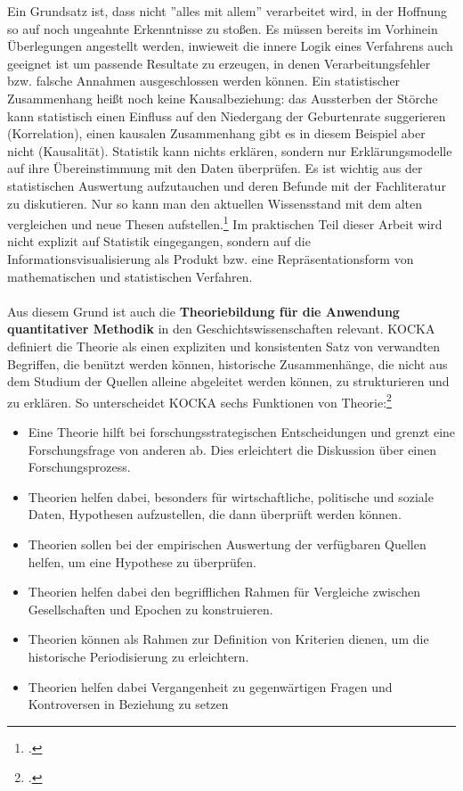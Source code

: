 \documentclass[12pt,a4paper]{article}
\begin{document}
Ein Grundsatz ist, dass nicht ''alles mit allem'' verarbeitet wird, in der Hoffnung so auf noch ungeahnte Erkenntnisse zu stoßen. Es müssen bereits im Vorhinein Überlegungen angestellt werden, inwieweit die innere Logik eines Verfahrens auch geeignet ist um passende Resultate zu erzeugen, in denen Verarbeitungsfehler bzw. falsche Annahmen ausgeschlossen werden können. Ein statistischer Zusammenhang heißt noch keine Kausalbeziehung: das Aussterben der Störche kann statistisch einen Einfluss auf den Niedergang der Geburtenrate suggerieren (Korrelation), einen kausalen Zusammenhang gibt es in diesem Beispiel aber nicht (Kausalität). Statistik kann nichts erklären, sondern nur Erklärungsmodelle auf ihre Übereinstimmung mit den Daten überprüfen. Es ist wichtig aus der statistischen Auswertung aufzutauchen und deren Befunde mit der Fachliteratur zu diskutieren. Nur so kann man den aktuellen Wissensstand mit dem alten vergleichen und neue Thesen aufstellen.\footcite[][S.182-191]{jarausch1985quantitative} Im praktischen Teil dieser Arbeit wird nicht explizit auf Statistik eingegangen, sondern auf die Informationsvisualisierung als Produkt bzw. eine Repräsentationsform von mathematischen und statistischen Verfahren.
\\
\\
Aus diesem Grund ist auch die \textbf{Theoriebildung für die Anwendung quantitativer Methodik} in den Geschichtswissenschaften relevant. KOCKA definiert die Theorie als einen expliziten und konsistenten Satz von verwandten Begriffen, die benützt werden können, historische Zusammenhänge, die nicht aus dem Studium der Quellen alleine abgeleitet werden können, zu strukturieren und zu erklären. So unterscheidet KOCKA  sechs Funktionen von Theorie:\footcite[][S.10-14]{schroder1988historische}  
\begin{itemize}
\item Eine Theorie hilft bei forschungsstrategischen Entscheidungen und grenzt eine Forschungsfrage von anderen ab. Dies erleichtert die Diskussion über einen Forschungsprozess.
\item Theorien helfen dabei, besonders für wirtschaftliche, politische und soziale Daten, Hypothesen aufzustellen, die dann überprüft werden können.
\item Theorien sollen bei der empirischen Auswertung der verfügbaren Quellen helfen, um eine Hypothese zu überprüfen.
\item Theorien helfen dabei den begrifflichen Rahmen für Vergleiche zwischen Gesellschaften und Epochen zu konstruieren.
\item Theorien können als Rahmen zur Definition von Kriterien dienen, um die historische Periodisierung zu erleichtern.
\item  Theorien helfen dabei Vergangenheit zu gegenwärtigen Fragen und Kontroversen in Beziehung zu setzen
\end{itemize}
\end{document}
